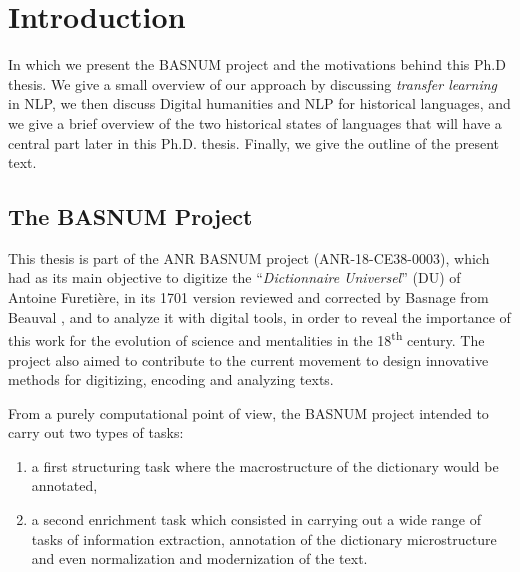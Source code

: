 \chapter{Introduction}

\begin{center}
    \begin{minipage}{0.66\textwidth}
        \begin{small}
            In which we present the BASNUM project and the motivations behind this Ph.D thesis. We give a small overview of our approach by discussing \emph{transfer learning} in NLP, we then discuss Digital humanities and NLP for historical languages, and we give a brief overview of the two historical states of languages that will have a central part later in this Ph.D. thesis. Finally, we give the outline of the present text.
        \end{small}
    \end{minipage}
    \vspace{0.5cm}
\end{center}

\section{The BASNUM Project}

This thesis is part of the ANR BASNUM project (ANR-18-CE38-0003), which had as its main objective to digitize the \enquote{\emph{Dictionnaire Universel}} (DU) of Antoine Furetière, in its 1701 version reviewed and corrected by Basnage from Beauval \citep{furetiere-1701-dictionnaire}, and to analyze it with digital tools, in order to reveal the importance of this work for the evolution of science and mentalities in the 18\textsuperscript{th} century. The project also aimed to contribute to the current movement to design innovative methods for digitizing, encoding and analyzing texts.

From a purely computational point of view, the BASNUM project intended to carry out two types of tasks:
\begin{enumerate}
    \item a first structuring task where the macrostructure of the dictionary would be annotated,
    \item a second enrichment task which consisted in carrying out a wide range of tasks of information extraction, annotation of the dictionary microstructure and even normalization and modernization of the text.
\end{enumerate}

